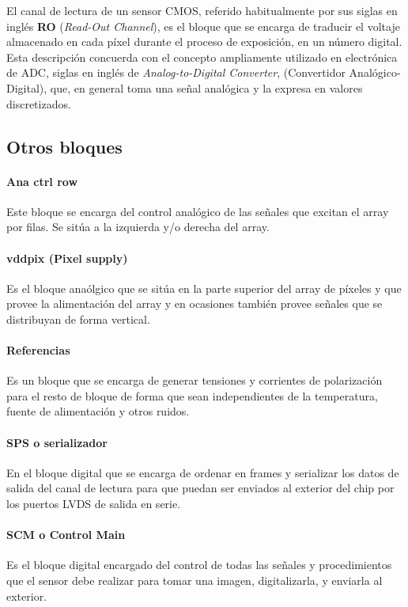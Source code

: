 El canal de lectura de un sensor CMOS, referido habitualmente por sus
siglas en inglés \textbf{RO} (\textit{Read-Out Channel}), es el bloque que se
encarga de traducir el voltaje almacenado en cada píxel durante el proceso
de exposición, en un número digital. Esta descripción concuerda con el concepto
ampliamente utilizado en electrónica de ADC, siglas en inglés de \textit{Analog-to-Digital
Converter}, (Convertidor Analógico-Digital), que, en general toma una señal
analógica y la expresa en valores discretizados.\\

\subsection{Otros bloques}

\paragraph{Ana ctrl row} Este bloque se encarga del control analógico de las
señales que excitan el array por filas. Se sitúa a la izquierda y/o derecha del
array.

\paragraph{vddpix (Pixel supply)} Es el bloque anaólgico que se sitúa en la parte superior
del array de píxeles y que provee la alimentación del array
y en ocasiones también provee señales que se distribuyan de forma vertical.

\paragraph{Referencias} Es un bloque que se encarga de generar tensiones y corrientes
de polarización para el resto de bloque de forma que sean independientes de la
temperatura, fuente de alimentación y otros ruidos.

\paragraph{SPS o serializador} En el bloque digital que se encarga de ordenar en frames y serializar
los datos de salida del canal de lectura para que puedan ser enviados al exterior del
chip por los puertos LVDS de salida en serie.

\paragraph{SCM o Control Main} Es el bloque digital encargado del control de todas las
señales y procedimientos que el sensor debe realizar para tomar una imagen, digitalizarla,
y enviarla al exterior.

